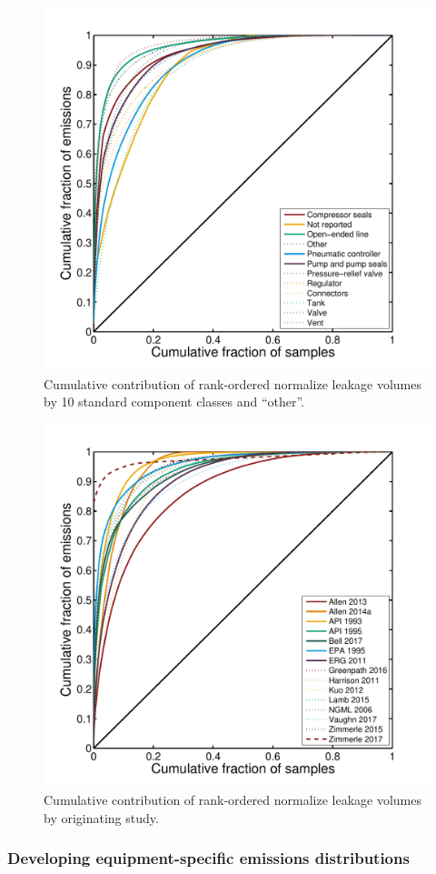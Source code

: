 \documentclass[11pt]{report}
\begin{document}
\begin{figure}[]
\includegraphics[width=0.7\columnwidth]{images/Components_Fat_Tail_Cumulative.pdf}
\caption{Cumulative contribution of rank-ordered normalize leakage volumes by 10 standard component classes and ``other''.}
\label{fig:Fat_Tail_Components}
\end{figure}

\begin{figure}[]
\includegraphics[width=0.7\columnwidth]{images/Studies_Fat_Tail_Cumulative.pdf}
\caption{Cumulative contribution of rank-ordered normalize leakage volumes by originating study.}
\label{fig:Fat_Tail_Study}
\end{figure}


\subsubsection{Developing equipment-specific emissions distributions}
\end{document}
